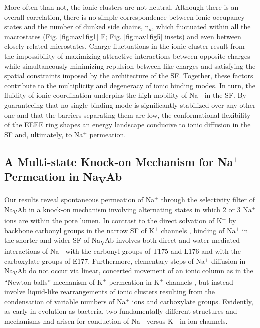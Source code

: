 \begin{refsection}
More often than not, the ionic clusters are not neutral.  Although there is an overall correlation, there is no simple correspondence between ionic occupancy states and the number of dunked side chains, n$_d$, which fluctuated within all the macrostates (Fig. \ref{fig:nav1fig1} F; Fig. \ref{fig:nav1fig5} insets) and even between closely related microstates.  Charge fluctuations in the ionic cluster result from the impossibility of maximizing attractive interactions between opposite charges while simultaneously minimizing repulsion between like charges and satisfying the spatial constraints imposed by the architecture of the SF.  Together, these factors contribute to the multiplicity and degeneracy of ionic binding modes.  In turn, the fluidity of ionic coordination underpins the high mobility of Na$^+$ in the SF.  By guaranteeing that no single binding mode is significantly stabilized over any other one and that the barriers separating them are low, the conformational flexibility of the EEEE ring shapes an energy landscape conducive to ionic diffusion in the SF and, ultimately, to Na$^+$ permeation. 

\subsection{A Multi-state Knock-on Mechanism for Na$^+$ Permeation in Na\textsubscript{V}Ab}

Our results reveal spontaneous permeation of Na$^+$ through the selectivity filter of Na\textsubscript{V}Ab in a knock-on mechanism involving alternating states in which 2 or 3 Na$^+$ ions are within the pore lumen.  In contrast to the direct solvation of K$^+$ by backbone carbonyl groups in the narrow SF of K$^+$ channels \cite{Doyle:1998wq,Zhou:2001vo}, binding of Na$^+$ in the shorter and wider SF of Na\textsubscript{V}Ab involves both direct and water-mediated interactions of Na$^+$ with the carbonyl groups of T175 and L176 and with the carboxylate groups of E177.  Furthermore, elementary steps of Na$^+$ diffusion in Na\textsubscript{V}Ab do not occur via linear, concerted movement of an ionic column as in the ``Newton balls'' mechanism of K$^+$ permeation in K$^+$ channels \cite{MoraisCabral:2001bp}, but instead involve liquid-like rearrangements of ionic clusters resulting from the condensation of variable numbers of Na$^+$ ions and carboxylate groups.  Evidently, as early in evolution as bacteria, two fundamentally different structures and mechanisms had arisen for conduction of Na$^+$ versus K$^+$ in ion channels.  


\end{refsection}
